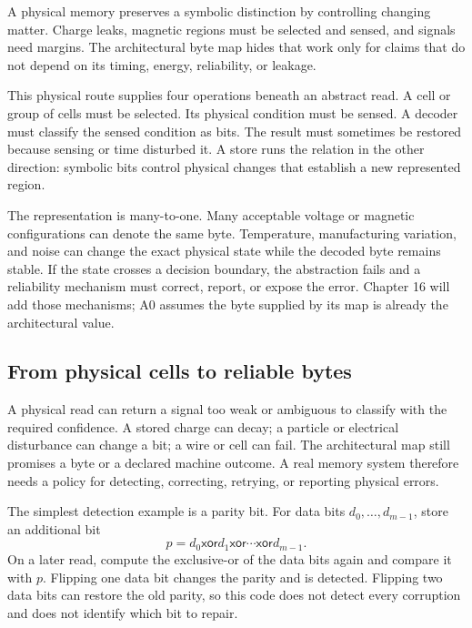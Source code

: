 \begin{archive}[title={A stored bit is maintained, not frozen}]
A physical memory preserves a symbolic distinction by controlling changing
matter. Charge leaks, magnetic regions must be selected and sensed, and
signals need margins. The architectural byte map hides that work only for
claims that do not depend on its timing, energy, reliability, or leakage.
\end{archive}

This physical route supplies four operations beneath an abstract read. A cell
or group of cells must be selected. Its physical condition must be sensed. A
decoder must classify the sensed condition as bits. The result must sometimes
be restored because sensing or time disturbed it. A store runs the relation in
the other direction: symbolic bits control physical changes that establish a
new represented region.

The representation is many-to-one. Many acceptable voltage or magnetic
configurations can denote the same byte. Temperature, manufacturing variation,
and noise can change the exact physical state while the decoded byte remains
stable. If the state crosses a decision boundary, the abstraction fails and a
reliability mechanism must correct, report, or expose the error. Chapter 16
will add those mechanisms; A0 assumes the byte supplied by its map is already
the architectural value.

\subsection{From physical cells to reliable bytes}

A physical read can return a signal too weak or ambiguous to classify with the
required confidence. A stored charge can decay; a particle or electrical
disturbance can change a bit; a wire or cell can fail. The architectural map
still promises a byte or a declared machine outcome. A real memory system
therefore needs a policy for detecting, correcting, retrying, or reporting
physical errors.

The simplest detection example is a parity bit. For data bits
\(d_0,\ldots,d_{m-1}\), store an additional bit
\[
 p=d_0\mathbin{\mathsf{xor}}d_1\mathbin{\mathsf{xor}}\cdots
   \mathbin{\mathsf{xor}}d_{m-1}.
\]
On a later read, compute the exclusive-or of the data bits again and compare it
with \(p\). Flipping one data bit changes the parity and is detected. Flipping
two data bits can restore the old parity, so this code does not detect every
corruption and does not identify which bit to repair.

